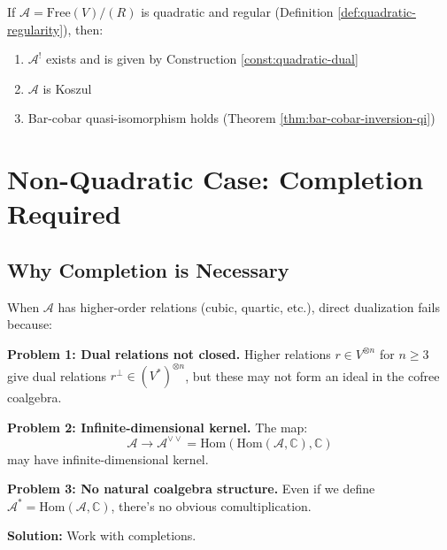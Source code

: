 \begin{theorem}\label{thm:regular-implies-koszul}
If $\mathcal{A} = \text{Free}(V) / (R)$ is quadratic and regular (Definition 
\ref{def:quadratic-regularity}), then:
\begin{enumerate}
\item $\mathcal{A}^!$ exists and is given by Construction \ref{const:quadratic-dual}
\item $\mathcal{A}$ is Koszul
\item Bar-cobar quasi-isomorphism holds (Theorem \ref{thm:bar-cobar-inversion-qi})
\end{enumerate}
\end{theorem}


\section{Non-Quadratic Case: Completion Required}
\label{sec:non-quadratic-existence}

\subsection{Why Completion is Necessary}

\begin{remark}\label{rem:non-quadratic-obstructions}
When $\mathcal{A}$ has higher-order relations (cubic, quartic, etc.), direct 
dualization fails because:

\textbf{Problem 1: Dual relations not closed.}
Higher relations $r \in V^{\otimes n}$ for $n \geq 3$ give dual relations 
$r^\perp \in (V^*)^{\otimes n}$, but these may not form an ideal in the cofree 
coalgebra.

\textbf{Problem 2: Infinite-dimensional kernel.}
The map:
$$\mathcal{A} \to \mathcal{A}^{\vee\vee} = \text{Hom}(\text{Hom}(\mathcal{A}, \mathbb{C}), \mathbb{C})$$
may have infinite-dimensional kernel.

\textbf{Problem 3: No natural coalgebra structure.}
Even if we define $\mathcal{A}^* = \text{Hom}(\mathcal{A}, \mathbb{C})$, there's 
no obvious comultiplication.

\textbf{Solution:} Work with completions.
\end{remark}

